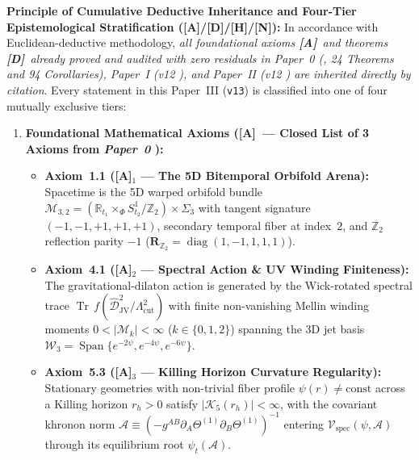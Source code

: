 \documentclass[11pt,a4paper]{article}
\newcommand{\catA}{\textbf{\textcolor{purple!80!black}{[A]}}}
\newcommand{\catD}{\textbf{\textcolor{blue!75!black}{[D]}}}
\newcommand{\catH}{\textbf{\textcolor{orange!85!black}{[H]}}}
\newcommand{\catN}{\textbf{\textcolor{teal!75!black}{[N]}}}
\theoremstyle{plain}
\theoremstyle{definition}
\theoremstyle{remark}
\numberwithin{equation}{section}
\begin{document}
\medskip
\noindent\textbf{Principle of Cumulative Deductive Inheritance and Four-Tier Epistemological Stratification (\catA/\catD/\catH/\catN):} In accordance with Euclidean-deductive methodology, \textit{all foundational axioms \catA\ and theorems \catD\ already proved and audited with zero residuals in \textit{Paper~0} (\cite{jimenez2026_p0}, 24 Theorems and 94 Corollaries), \textit{Paper~I} (v12 \cite{jimenez2026a}), and \textit{Paper~II} (v12 \cite{jimenez2026b}) are inherited directly by citation}. Every statement in this Paper~III (\texttt{v13}) is classified into one of four mutually exclusive tiers:
\begin{enumerate}
  \item \textbf{Foundational Mathematical Axioms (\catA\ — Closed List of 3 Axioms from \textit{Paper~0} \cite{jimenez2026_p0}):}
  \begin{itemize}
    \item \textbf{Axiom~1.1 (\catA$_1$ — The 5D Bitemporal Orbifold Arena):} Spacetime is the 5D warped orbifold bundle $\mathcal{M}_{3,2} = (\mathbb{R}_{t_1} \times_{\Phi} S^1_{t_2}/\mathbb{Z}_2) \times \Sigma_3$ with tangent signature $(-1,-1,+1,+1,+1)$, secondary temporal fiber at index~$2$, and $\mathbb{Z}_2$ reflection parity $-1$ ($\mathbf{R}_{\mathbb{Z}_2} = \operatorname{diag}(1,-1,1,1,1)$).
    \item \textbf{Axiom~4.1 (\catA$_2$ — Spectral Action \& UV Winding Finiteness):} The gravitational-dilaton action is generated by the Wick-rotated spectral trace $\operatorname{Tr}\,f(\widehat{\mathcal{D}}_{\text{JV}}^2/\Lambda_{\text{cut}}^2)$ with finite non-vanishing Mellin winding moments $0 < |\mathcal{M}_k| < \infty$ ($k \in \{0,1,2\}$) spanning the 3D jet basis $\mathcal{W}_3 = \operatorname{Span}\{e^{-2\psi}, e^{-4\psi}, e^{-6\psi}\}$.
    \item \textbf{Axiom~5.3 (\catA$_3$ — Killing Horizon Curvature Regularity):} Stationary geometries with non-trivial fiber profile $\psi(r) \neq \text{const}$ across a Killing horizon $r_h > 0$ satisfy $|\mathcal{K}_5(r_h)| < \infty$, with the covariant khronon norm $\mathcal{A} \equiv (-g^{AB}\partial_A\Theta^{(1)}\partial_B\Theta^{(1)})^{-1}$ entering $\mathcal{V}_{\text{spec}}(\psi, \mathcal{A})$ through its equilibrium root $\psi_t(\mathcal{A})$.
  \end{itemize}

\end{enumerate}
\end{document}
